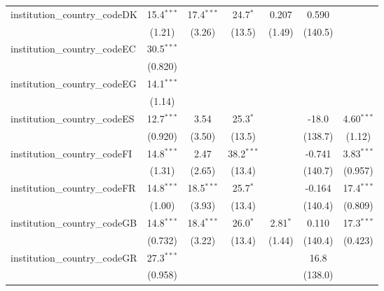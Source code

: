 \begin{tabular}{lcccccc}
   institution\_country\_codeDK          & 15.4$^{***}$  & 17.4$^{***}$ & 24.7$^{*}$   & 0.207         & 0.590         &   \\   
                                         & (1.21)        & (3.26)       & (13.5)       & (1.49)        & (140.5)       &   \\   
   institution\_country\_codeEC          & 30.5$^{***}$  &              &              &               &               &   \\   
                                         & (0.820)       &              &              &               &               &   \\   
   institution\_country\_codeEG          & 14.1$^{***}$  &              &              &               &               &   \\   
                                         & (1.14)        &              &              &               &               &   \\   
   institution\_country\_codeES          & 12.7$^{***}$  & 3.54         & 25.3$^{*}$   &               & -18.0         & 4.60$^{***}$\\   
                                         & (0.920)       & (3.50)       & (13.5)       &               & (138.7)       & (1.12)\\   
   institution\_country\_codeFI          & 14.8$^{***}$  & 2.47         & 38.2$^{***}$ &               & -0.741        & 3.83$^{***}$\\   
                                         & (1.31)        & (2.65)       & (13.4)       &               & (140.7)       & (0.957)\\   
   institution\_country\_codeFR          & 14.8$^{***}$  & 18.5$^{***}$ & 25.7$^{*}$   &               & -0.164        & 17.4$^{***}$\\   
                                         & (1.00)        & (3.93)       & (13.4)       &               & (140.4)       & (0.809)\\   
   institution\_country\_codeGB          & 14.8$^{***}$  & 18.4$^{***}$ & 26.0$^{*}$   & 2.81$^{*}$    & 0.110         & 17.3$^{***}$\\   
                                         & (0.732)       & (3.22)       & (13.4)       & (1.44)        & (140.4)       & (0.423)\\   
   institution\_country\_codeGR          & 27.3$^{***}$  &              &              &               & 16.8          &   \\   
                                         & (0.958)       &              &              &               & (138.0)       &   \\   

\end{tabular}
